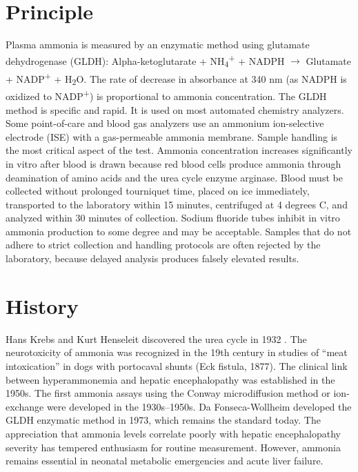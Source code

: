 \section*{Principle}
Plasma ammonia is measured by an enzymatic method using glutamate dehydrogenase (GLDH): Alpha-ketoglutarate + NH\textsubscript{4}\textsuperscript{+} + NADPH $\rightarrow$ Glutamate + NADP\textsuperscript{+} + H\textsubscript{2}O. The rate of decrease in absorbance at 340 nm (as NADPH is oxidized to NADP\textsuperscript{+}) is proportional to ammonia concentration. The GLDH method is specific and rapid. It is used on most automated chemistry analyzers. Some point-of-care and blood gas analyzers use an ammonium ion-selective electrode (ISE) with a gas-permeable ammonia membrane. Sample handling is the most critical aspect of the test. Ammonia concentration increases significantly in vitro after blood is drawn because red blood cells produce ammonia through deamination of amino acids and the urea cycle enzyme arginase. Blood must be collected without prolonged tourniquet time, placed on ice immediately, transported to the laboratory within 15 minutes, centrifuged at 4 degrees C, and analyzed within 30 minutes of collection. Sodium fluoride tubes inhibit in vitro ammonia production to some degree and may be acceptable. Samples that do not adhere to strict collection and handling protocols are often rejected by the laboratory, because delayed analysis produces falsely elevated results.

\section*{History}
Hans Krebs and Kurt Henseleit discovered the urea cycle in 1932 \cite{krebs1932untersuchungen}. The neurotoxicity of ammonia was recognized in the 19th century in studies of ``meat intoxication'' in dogs with portocaval shunts (Eck fistula, 1877). The clinical link between hyperammonemia and hepatic encephalopathy was established in the 1950s. The first ammonia assays using the Conway microdiffusion method or ion-exchange were developed in the 1930s--1950s. Da Fonseca-Wollheim developed the GLDH enzymatic method in 1973, which remains the standard today. The appreciation that ammonia levels correlate poorly with hepatic encephalopathy severity has tempered enthusiasm for routine measurement. However, ammonia remains essential in neonatal metabolic emergencies and acute liver failure.


